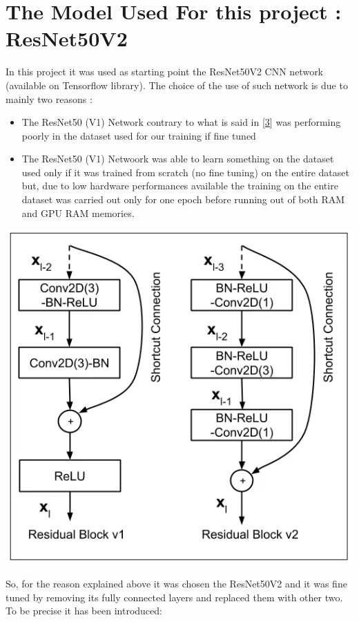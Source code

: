 \section{The Model Used For this project : ResNet50V2}

\begin{flushleft}

In this project it was used as starting point the ResNet50V2 CNN network (available on Tensorflow library). The choice of the use of such network is due to mainly two reasons :
\begin{itemize}
    \item The ResNet50 (V1) Network contrary to what is said in [\href{ https://arxiv.org/abs/2110.04316}{3}] was performing poorly in the dataset used for our training if fine tuned
    \item The ResNet50 (V1) Netwoork was able to learn something on the dataset used only if it was trained from scratch (no fine tuning) on the entire dataset but, due to low hardware performances available the training on the entire dataset was carried out only for one epoch before running out of both RAM and GPU RAM memories.
\end{itemize}
\begin{center}
\includegraphics[scale = 0.35]{Images/ResnetVersus.PNG}    
\end{center}
So, for the reason explained above it was chosen the ResNet50V2 and it was fine tuned by removing its fully connected layers and replaced them with other two. To be precise it has been introduced:

\end{flushleft}
